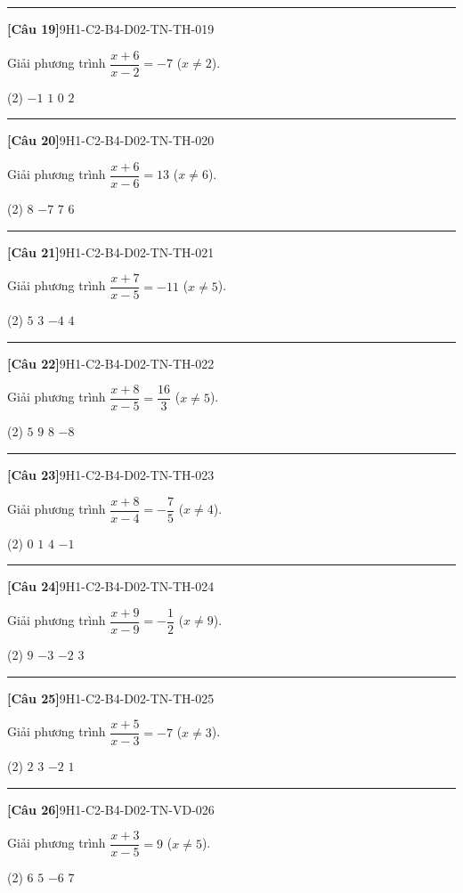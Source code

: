 \documentclass[12pt,a4paper]{article}
\newif\ifloigiai
\newenvironment{cauhoi}[2]{%
  \par\medskip\noindent\rule{\textwidth}{0.4pt}\par\nopagebreak
  \noindent\textbf{[#1]}\hfill{\scriptsize\ttfamily #2}\par\nopagebreak\smallskip}{\par}
\newcommand{\dapan}[1]{\ifloigiai\par\smallskip\noindent\textit{Đáp án:} \textbf{#1}\par\fi}
\begin{document}
\begin{cauhoi}{Câu 19}{9H1-C2-B4-D02-TN-TH-019}
Giải phương trình $\dfrac{x+6}{x-2}=-7$ ($x\ne 2$).
\begin{tasks}(2)
\task $-1$
\task $1$
\task $0$
\task $2$
\end{tasks}
\dapan{B}
\end{cauhoi}
\begin{cauhoi}{Câu 20}{9H1-C2-B4-D02-TN-TH-020}
Giải phương trình $\dfrac{x+6}{x-6}=13$ ($x\ne 6$).
\begin{tasks}(2)
\task $8$
\task $-7$
\task $7$
\task $6$
\end{tasks}
\dapan{C}
\end{cauhoi}
\begin{cauhoi}{Câu 21}{9H1-C2-B4-D02-TN-TH-021}
Giải phương trình $\dfrac{x+7}{x-5}=-11$ ($x\ne 5$).
\begin{tasks}(2)
\task $5$
\task $3$
\task $-4$
\task $4$
\end{tasks}
\dapan{D}
\end{cauhoi}
\begin{cauhoi}{Câu 22}{9H1-C2-B4-D02-TN-TH-022}
Giải phương trình $\dfrac{x+8}{x-5}=\dfrac{16}{3}$ ($x\ne 5$).
\begin{tasks}(2)
\task $5$
\task $9$
\task $8$
\task $-8$
\end{tasks}
\dapan{C}
\end{cauhoi}
\begin{cauhoi}{Câu 23}{9H1-C2-B4-D02-TN-TH-023}
Giải phương trình $\dfrac{x+8}{x-4}=-\dfrac{7}{5}$ ($x\ne 4$).
\begin{tasks}(2)
\task $0$
\task $1$
\task $4$
\task $-1$
\end{tasks}
\dapan{D}
\end{cauhoi}
\begin{cauhoi}{Câu 24}{9H1-C2-B4-D02-TN-TH-024}
Giải phương trình $\dfrac{x+9}{x-9}=-\dfrac{1}{2}$ ($x\ne 9$).
\begin{tasks}(2)
\task $9$
\task $-3$
\task $-2$
\task $3$
\end{tasks}
\dapan{B}
\end{cauhoi}
\begin{cauhoi}{Câu 25}{9H1-C2-B4-D02-TN-TH-025}
Giải phương trình $\dfrac{x+5}{x-3}=-7$ ($x\ne 3$).
\begin{tasks}(2)
\task $2$
\task $3$
\task $-2$
\task $1$
\end{tasks}
\dapan{A}
\end{cauhoi}
\begin{cauhoi}{Câu 26}{9H1-C2-B4-D02-TN-VD-026}
Giải phương trình $\dfrac{x+3}{x-5}=9$ ($x\ne 5$).
\begin{tasks}(2)
\task $6$
\task $5$
\task $-6$
\task $7$
\end{tasks}
\dapan{A}
\end{cauhoi}
\end{document}
